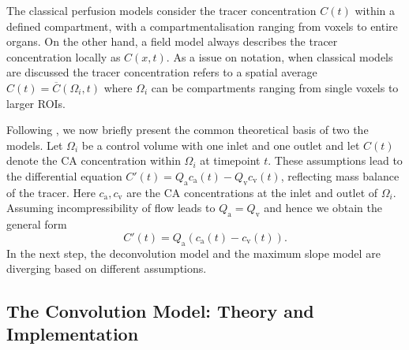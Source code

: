 \documentclass[paper=a4, fontsize=11pt,parskip=half,headings=small]{scrartcl}
\newcommand{\ca}{c_\mathrm{a}}
\newcommand{\cout}{c_{\mathrm{v}}}
\newcommand{\Pa}{Q_{\mathrm{a}}}
\newcommand{\Pout}{Q_{\mathrm{v}}}
\begin{document}
	The classical perfusion models consider the tracer concentration $C(t)$ within a defined compartment, with a compartmentalisation ranging from voxels to entire organs. On the other hand, a field model always describes the tracer concentration locally as $C(x,t)$. As a issue on notation, when classical models are discussed the tracer concentration refers to a spatial average $C(t) = \overline{C}(\Omega_i,t)$ where $\Omega_i$ can be compartments ranging from single voxels to larger ROIs.
		
	Following \cite{sourbron13}, we now briefly present the common theoretical basis of two the models.
	Let $\Omega_i$ be a control volume with one inlet and one outlet and let $C(t)$ denote the CA concentration within $\Omega_i$ at timepoint $t$.
	These assumptions lead to the differential equation $C'(t) = \Pa\ca(t) - \Pout\cout(t)$, reflecting mass balance of the tracer. 
	Here $\ca,\cout$ are the CA concentrations at the inlet and outlet of $\Omega_i$.
	Assuming incompressibility of flow leads to $\Pa = \Pout$ and hence we obtain the general form
	\begin{equation}
		C'(t) = \Pa\left(\ca(t) - \cout(t)\right).
		\label{eq:classicgeneral}
	\end{equation}
	In the next step, the deconvolution model and the maximum slope model are diverging based on different assumptions.

	\subsection{The Convolution Model: Theory and Implementation}\label{sec:conv}
	
\end{document}
